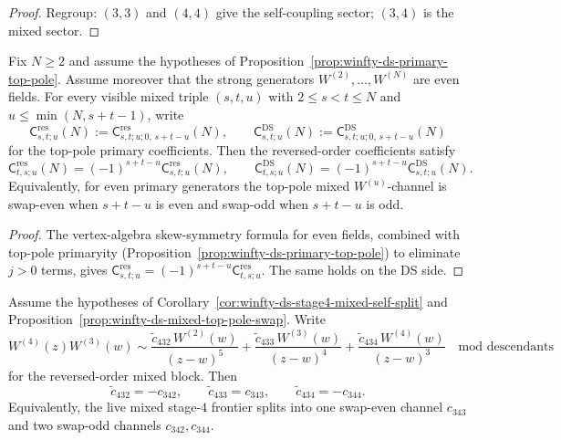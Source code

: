 \begin{proof}
Regroup: $(3,3)$ and $(4,4)$ give the self-coupling sector; $(3,4)$ is the mixed sector.
\end{proof}

\begin{proposition}
\label{prop:winfty-ds-mixed-top-pole-swap}
Fix $N \ge 2$ and assume the hypotheses of
Proposition~\ref{prop:winfty-ds-primary-top-pole}.  Assume moreover
that the strong generators $W^{(2)},\dots,W^{(N)}$ are even fields.
For every visible mixed triple $(s,t,u)$ with $2 \le s < t \le N$ and
$u \le \min(N,s+t-1)$, write
\[
\mathsf{C}^{\mathrm{res}}_{s,t;u}(N)
:=
\mathsf{C}^{\mathrm{res}}_{s,t;u;0,\,s+t-u}(N),
\qquad
\mathsf{C}^{\mathrm{DS}}_{s,t;u}(N)
:=
\mathsf{C}^{\mathrm{DS}}_{s,t;u;0,\,s+t-u}(N)
\]
for the top-pole primary coefficients.  Then the reversed-order
coefficients satisfy
\[
\mathsf{C}^{\mathrm{res}}_{t,s;u}(N)
=
(-1)^{s+t-u}\mathsf{C}^{\mathrm{res}}_{s,t;u}(N),
\qquad
\mathsf{C}^{\mathrm{DS}}_{t,s;u}(N)
=
(-1)^{s+t-u}\mathsf{C}^{\mathrm{DS}}_{s,t;u}(N).
\]
Equivalently, for even primary generators the top-pole mixed
$W^{(u)}$-channel is swap-even when $s+t-u$ is even and swap-odd when
$s+t-u$ is odd.
\end{proposition}

\begin{proof}
The vertex-algebra skew-symmetry formula for even fields, combined with top-pole primaryity (Proposition~\ref{prop:winfty-ds-primary-top-pole}) to eliminate $j>0$ terms, gives $\mathsf{C}_{s,t;u}^{\mathrm{res}}=(-1)^{s+t-u}\mathsf{C}_{t,s;u}^{\mathrm{res}}$.  The same holds on the DS side.
\end{proof}

\begin{corollary}
\label{cor:winfty-ds-stage4-mixed-swap-parity}
Assume the hypotheses of
Corollary~\ref{cor:winfty-ds-stage4-mixed-self-split} and
Proposition~\ref{prop:winfty-ds-mixed-top-pole-swap}.  Write
\[
W^{(4)}(z)W^{(3)}(w)
\sim
\frac{\widetilde c_{432}\,W^{(2)}(w)}{(z-w)^5}
+\frac{\widetilde c_{433}\,W^{(3)}(w)}{(z-w)^4}
+\frac{\widetilde c_{434}\,W^{(4)}(w)}{(z-w)^3}
\quad\text{mod descendants}
\]
for the reversed-order mixed block.  Then
\[
\widetilde c_{432}=-c_{342},
\qquad
\widetilde c_{433}=c_{343},
\qquad
\widetilde c_{434}=-c_{344}.
\]
Equivalently, the live mixed stage-$4$ frontier splits into one
swap-even channel $c_{343}$ and two swap-odd channels
$c_{342},c_{344}$.
\end{corollary}

